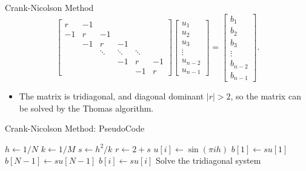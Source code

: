 \documentclass{beamer}
\newcommand{\beforeverb}{\footnotesize}
\newcommand{\afterverb}{\normalsize}
\begin{document}
\begin{frame}{Crank-Nicolson Method}
    $$
    \left[\begin{array}{rrrrrr}
    r & -1 & & & & \\
    -1 & r & -1 & & & \\
    & -1 & r & -1 & & \\
    & & \ddots & \ddots & \ddots & \\
    & & & -1 & r & -1 \\
    & & & & -1 & r
    \end{array}\right]\left[\begin{array}{c}
    u_1 \\
    u_2 \\
    u_3 \\
    \vdots \\
    u_{n-2} \\
    u_{n-1}
    \end{array}\right]=\left[\begin{array}{c}
    b_1 \\
    b_2 \\
    b_3 \\
    \vdots \\
    b_{n-2} \\
    b_{n-1}
    \end{array}\right].
    $$
    \begin{itemize}
        \item The matrix is tridiagonal, and diagonal dominant $|r|>2$, so the matrix can be solved by 
        the Thomas algorithm.
     
    \end{itemize}
\end{frame}
\begin{frame}{Crank-Nicolson Method: PseudoCode}
    \beforeverb
    \begin{algorithmic}
        \State $h \gets 1/N$
        \State $k \gets 1/M$
        \State $s \gets h^2/k$
        \State $r \gets 2+s$
        \State $u[i] \gets \sin(\pi i h)$ 
        \EndFor
        \State $b[1] \gets s u[1]$
        \State $b[N-1] \gets s u[N-1]$
        \State $b[i] \gets s u[i]$
        \EndFor
        \State Solve the tridiagonal system
        \EndFor
        \EndProcedure
    \end{algorithmic}
\afterverb
\end{frame}
\end{document}
